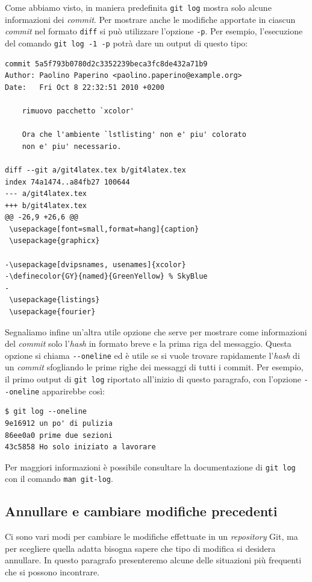 \documentclass[a4paper,12pt,oneside]{article}
\begin{document}
Come abbiamo visto, in maniera predefinita \lstinline|git log| mostra solo
alcune informazioni dei \emph{commit}. Per mostrare anche le modifiche apportate
in ciascun \emph{commit} nel formato \lstinline|diff| si può utilizzare
l'opzione \lstinline|-p|. Per esempio, l'esecuzione del comando
\lstinline|git log -1 -p| potrà dare un output di questo tipo:
\begin{lstlisting}
commit 5a5f793b0780d2c3352239beca3fc8de432a71b9
Author: Paolino Paperino <paolino.paperino@example.org>
Date:   Fri Oct 8 22:32:51 2010 +0200

    rimuovo pacchetto `xcolor'

    Ora che l'ambiente `lstlisting' non e' piu' colorato
    non e' piu' necessario.

diff --git a/git4latex.tex b/git4latex.tex
index 74a1474..a84fb27 100644
--- a/git4latex.tex
+++ b/git4latex.tex
@@ -26,9 +26,6 @@
 \usepackage[font=small,format=hang]{caption}
 \usepackage{graphicx}

-\usepackage[dvipsnames, usenames]{xcolor}
-\definecolor{GY}{named}{GreenYellow} % SkyBlue
-
 \usepackage{listings}
 \usepackage{fourier}
\end{lstlisting}

Segnaliamo infine un'altra utile opzione che serve per mostrare come
informazioni del \emph{commit} solo l'\emph{hash} in formato breve e la prima
riga del messaggio. Questa opzione si chiama \lstinline|--oneline| ed è utile se
si vuole trovare rapidamente l'\emph{hash} di un \emph{commit} sfogliando le
prime righe dei messaggi di tutti i commit. Per esempio, il primo output di
\lstinline|git log| riportato all'inizio di questo paragrafo, con l'opzione
\lstinline|--oneline| apparirebbe così:
\begin{lstlisting}
$ git log --oneline
9e16912 un po' di pulizia
86ee0a0 prime due sezioni
43c5858 Ho solo iniziato a lavorare
\end{lstlisting}

Per maggiori informazioni è possibile consultare la documentazione di
\lstinline|git log| con il comando \lstinline|man git-log|.

\subsection{Annullare e cambiare modifiche precedenti}
\label{sec:annullare-modifiche}

Ci sono vari modi per cambiare le modifiche effettuate in un \emph{repository}
Git, ma per scegliere quella adatta bisogna sapere che tipo di modifica si
desidera annullare. In questo paragrafo presenteremo alcune delle situazioni più
frequenti che si possono incontrare.
\end{document}
